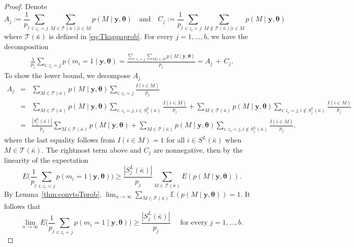 \documentclass[
  12pt]{article}
\newcommand{\E}{\mathbb{E}}
\newcommand{\T}{\mathcal{T}}
\newcommand{\by}{\mathbf{y}}
\newcommand{\btheta}{\boldsymbol{\theta}}
\begin{document}
\begin{proof}
Denote
$$A_j:=\frac{1}{p_j}\sum_{i:z_i=j}\sum_{M \in \T(\bar{\kappa})|i \in  M} p(M \mid \by, \btheta) \quad\text{and}\quad  C_j:=\frac{1}{p_j}\sum_{i:z_i=j}\sum_{M \not\in \T(\bar{\kappa})|i \in  M} p(M \mid \by, \btheta)$$
where $\T(\bar{\kappa})$ is defined in \eqref{eq:Tkappaprob}.
For every $j=1,\ldots,b$, we have the decomposition
\begin{gather}\label{eq:decompshatprob}
    \frac{1}{p_j}\sum_{i:z_i=j} p(m_i=1 \mid \by, \btheta)
    =\frac{\sum_{i:z_i=j} \sum_{M  | i \in M}  p(M \mid \by, \btheta)}{p_j}
   =A_j\,+\, C_j.
\end{gather}
To show the lower bound, we decompose $A_j$
\begin{eqnarray}
  A_j
   &=& \sum_{M \in \T(\bar{\kappa})} p(M \mid \by, \btheta)\sum_{i:z_i=j}\frac{I(i\in  M)}{p_j}\nonumber\\
   &=& \sum_{M \in \T(\bar{\kappa})} p(M \mid \by, \btheta)\sum_{i:z_i=j, i \in S^{L}_j(\bar{\kappa})}\frac{I(i\in  M)}{p_j}+\sum_{M \in \T(\bar{\kappa})} p(M \mid \by, \btheta)\sum_{i:z_i=j, i\not\in S^{L}_j(\bar{\kappa})}\frac{I(i\in  M)}{p_j}\nonumber\\
   &=& \frac{|S^{L}_j(\bar{\kappa})|}{p_j}\sum_{M \in \T(\bar{\kappa})} p(M \mid \by, \btheta)+\sum_{M \in \T(\bar{\kappa})} p(M \mid \by, \btheta)\sum_{i:z_i=j, i\not\in S^{L}_j(\bar{\kappa})}\frac{I(i\in  M)}{p_j}\label{eq:wigrprob}.
\end{eqnarray}
where the last equality follows from $I(i\in  M)=1$ for all $i \in S^L(\bar{\kappa})$ when $M\in\T(\bar{\kappa})$. The rightmost term above and $C_j$ are nonnegative, then by the linearity of the expectation
$$E\bigg(\frac{1}{p_j}\sum_{i:z_i=j} p(m_i=1 \mid \by, \btheta)\bigg)\geq\frac{|S^{L}_j(\bar{\kappa})|}{p_j}\sum_{M \in \T(\bar{\kappa})}E( p(M \mid \by, \btheta)).$$
By Lemma~\ref{thm:convtoTprob}, $\lim_{n\to\infty}\sum_{M \in \T(\bar{\kappa})}\E( p(M \mid \by, \btheta))=1$. It follows that $$\lim_{n\to\infty}E\bigg(\frac{1}{p_j}\sum_{i:z_i=j} p(m_i=1 \mid \by, \btheta)\bigg)\geq \frac{|S^{L}_j(\bar{\kappa})|}{p_j}\quad\text{ for every   }j=1,\ldots,b.$$


\end{proof}
\end{document}
